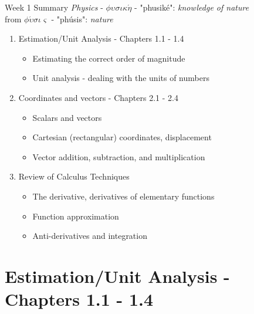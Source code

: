 \documentclass{beamer}
\begin{document}
\begin{frame}{Week 1 Summary}
\textit{Physics} - $\phi\upsilon\sigma\iota\kappa\acute{\eta}$ - "phusik\'e": \textit{knowledge of nature} \\
from $\phi\acute{\upsilon}\sigma\iota\varsigma$ - "ph\'usis": \textit{nature}
\begin{enumerate}
\item Estimation/Unit Analysis - Chapters 1.1 - 1.4
\begin{itemize}
\item \alert{Estimating} the correct order of magnitude
\item \alert{Unit analysis} - dealing with the units of numbers
\end{itemize}
\item Coordinates and vectors - Chapters 2.1 - 2.4
\begin{itemize}
\item \alert{Scalars} and \alert{vectors}
\item \alert{Cartesian} (rectangular) coordinates, displacement
\item \alert{Vector} addition, subtraction, and multiplication
\end{itemize}
\item Review of Calculus Techniques
\begin{itemize}
\item The derivative, derivatives of elementary functions
\item \alert{Function} approximation
\item Anti-derivatives and integration
\end{itemize}
\end{enumerate}
\end{frame}

\section{Estimation/Unit Analysis - Chapters 1.1 - 1.4}
\end{document}
